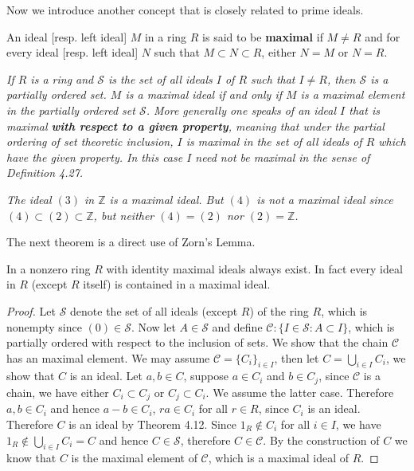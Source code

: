 Now we introduce another concept that is closely related to prime ideals.
\begin{definition}
An ideal [resp. left ideal] $M$ in a ring $R$ is said to be \textbf{maximal} if $M\ne R$ and for every ideal [resp. left ideal] $N$ such that $M\subset N\subset R$, either $N=M$ or $N=R$.
\end{definition}
\begin{note}\em
If $R$ is a ring and $\mathcal{S}$ is the set of all ideals $I$ of $R$ such that $I\ne R$, then $\mathcal{S}$ is a partially ordered set. $M$ is a maximal ideal if and only if $M$ is a maximal element in the partially ordered set $\mathcal{S}$. More generally one speaks of an ideal $I$ that is maximal \textbf{with respect to a given property}, meaning that under the partial ordering of set theoretic inclusion, $I$ is maximal in the set of all ideals of $R$ which have the given property. In this case $I$ need not be maximal in the sense of Definition 4.27.
\end{note}
\begin{example}\em
The ideal $(3)$ in $\mathbb{Z}$ is a maximal ideal. But $(4)$ is not a maximal ideal since $(4)\subset(2)\subset\mathbb{Z}$, but neither $(4)=(2)$ nor $(2)=\mathbb{Z}$.
\end{example}
The next theorem is a direct use of Zorn's Lemma.
\begin{theorem}
In a nonzero ring $R$ with identity maximal ideals always exist. In fact every ideal in $R$ (except $R$ itself) is contained in a maximal ideal.
\end{theorem}
\begin{proof}
Let $\mathcal{S}$ denote the set of all ideals (except $R$) of the ring $R$, which is nonempty since $(0)\in\mathcal{S}$. Now let $A\in\mathcal{S}$ and define $\mathcal{C}:\{I\in\mathcal{S}:A\subset I\}$, which is partially ordered with respect to the inclusion of sets. We show that the chain $\mathcal{C}$ has an maximal element. We may assume $\mathcal{C}=\{C_i\}_{i\in I}$, then let $C=\bigcup_{i\in I}C_i$, we show that $C$ is an ideal. Let $a,b\in C$, suppose $a\in C_i$ and $b\in C_j$, since $\mathcal{C}$ is a chain, we have either $C_i\subset C_j$ or $C_j\subset C_i$. We assume the latter case. Therefore $a,b\in C_i$ and hence $a-b\in C_i$, $ra\in C_i$ for all $r\in R$, since $C_i$ is an ideal. Therefore $C$ is an ideal by Theorem 4.12. Since $1_R\notin C_i$ for all $i\in I$, we have $1_R\notin\bigcup_{i\in I}C_i=C$ and hence $C\in\mathcal{S}$, therefore $C\in\mathcal{C}$. By the construction of $C$ we know that $C$ is the maximal element of $\mathcal{C}$, which is a maximal ideal of $R$.
\end{proof}
